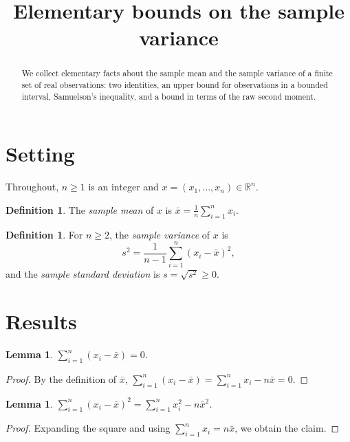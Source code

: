 \documentclass[11pt]{article}
\title{Elementary bounds on the sample variance}
\author{}
\date{}
\newtheorem{lemma}[theorem]{Lemma}
\theoremstyle{definition}
\newtheorem{definition}[theorem]{Definition}
\begin{document}
\maketitle

\begin{abstract}
We collect elementary facts about the sample mean and the sample variance of a finite set of real observations:
two identities, an upper bound for observations in a bounded interval, Samuelson's inequality, and a bound in
terms of the raw second moment.
\end{abstract}

\section{Setting}

Throughout, $n \ge 1$ is an integer and $x = (x_1, \dots, x_n) \in \mathbb{R}^n$.

\begin{definition}\label{def:mean}
The \emph{sample mean} of $x$ is $\bar x = \frac{1}{n} \sum_{i=1}^n x_i$.
\end{definition}

\begin{definition}\label{def:var}
For $n \ge 2$, the \emph{sample variance} of $x$ is
\[
  s^2 = \frac{1}{n-1} \sum_{i=1}^n (x_i - \bar x)^2 ,
\]
and the \emph{sample standard deviation} is $s = \sqrt{s^2} \ge 0$.
\end{definition}

\section{Results}

\begin{lemma}\label{lem:centred}
$\sum_{i=1}^n (x_i - \bar x) = 0$.
\end{lemma}

\begin{proof}
By the definition of $\bar x$, $\sum_{i=1}^n (x_i - \bar x) = \sum_{i=1}^n x_i - n \bar x = 0$.
\end{proof}

\begin{lemma}\label{lem:shortcut}
$\sum_{i=1}^n (x_i - \bar x)^2 = \sum_{i=1}^n x_i^2 - n \bar x^2$.
\end{lemma}

\begin{proof}
Expanding the square and using $\sum_{i=1}^n x_i = n \bar x$, we obtain the claim.
\end{proof}
\end{document}
